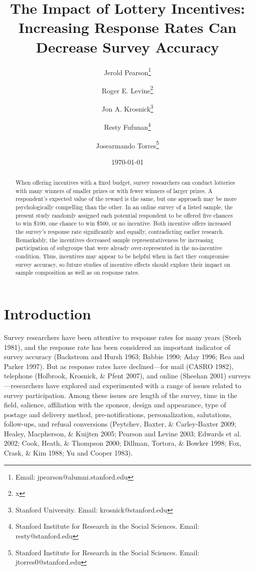 \documentclass[12pt]{article}
\title{\Large\textbf{The Impact of Lottery Incentives:\\ 
Increasing Response Rates Can Decrease Survey Accuracy}}
\author{
    Jerold Pearson\thanks{Email: jpearson@alumni.stanford.edu} 
    \and 
    Roger E. Levine\thanks{x}
    \and
    Jon A. Krosnick\thanks{Stanford University. Email: krosnick@stanford.edu}
    \and
    Resty Fufunan\thanks{Stanford Institute for Research in the Social Sciences. Email: resty@stanford.edu}
    \and
    Josearmando Torres\thanks{Stanford Institute for Research in the Social Sciences. Email: jtorres0@stanford.edu}
}
\date{\today}
\begin{document}
\maketitle


\begin{abstract}
\noindent
When offering incentives with a fixed budget, survey researchers can conduct lotteries with many winners of smaller prizes or with fewer winners of larger prizes.  A respondent's expected value of the reward is the same, but one approach may be more psychologically compelling than the other.  In an online survey of a listed sample, the present study randomly assigned each potential respondent to be offered five chances to win \$100, one chance to win \$500, or no incentive.  Both incentive offers increased the survey's response rate significantly and equally, contradicting earlier research.  Remarkably, the incentives decreased sample representativeness by increasing participation of subgroups that were already over-represented in the no-incentive condition.  Thus, incentives may appear to be helpful when in fact they compromise survey accuracy, so future studies of incentive effects should explore their impact on sample composition as well as on response rates.

\end{abstract}

\thispagestyle{empty}  %
\newpage
\setcounter{page}{1}


\section{Introduction}

Survey researchers have been attentive to response rates for many years (Steeh 1981), and the response rate has been considered an important indicator of survey accuracy (Backstrom and Hursh 1963; Babbie 1990; Aday 1996; Rea and Parker 1997). But as response rates have declined—for mail (CASRO 1982), telephone (Holbrook, Krosnick, \& Pfent 2007), and online (Sheehan 2001) surveys—researchers have explored and experimented with a range of issues related to survey participation. Among these issues are length of the survey, time in the field, salience, affiliation with the sponsor, design and appearance, type of postage and delivery method, pre-notifications, personalization, salutations, follow-ups, and refusal conversions (Peytchev, Baxter, \& Carley-Baxter 2009; Healey, Macpherson, \& Kuijten 2005; Pearson and Levine 2003; Edwards et al. 2002; Cook, Heath, \& Thompson 2000; Dillman, Tortora, \& Bowker 1998; Fox, Crask, \& Kim 1988; Yu and Cooper 1983).
\end{document}
